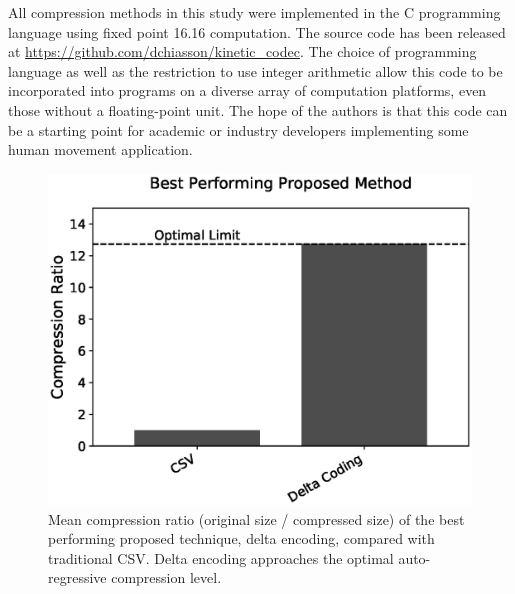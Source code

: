 \documentclass[journal]{IEEEtran}
\begin{document}
All compression methods in this study were implemented in the C programming language using fixed point 16.16 computation. The source code has been released at \url{https://github.com/dchiasson/kinetic_codec}. The choice of programming language as well as the restriction to use integer arithmetic allow this code to be incorporated into programs on a diverse array of computation platforms, even those without a floating-point unit. The hope of the authors is that this code can be a starting point for academic or industry developers implementing some human movement application.

\begin{figure}

  \includegraphics[width=\linewidth]{diff.eps}
  \caption{Mean compression ratio (original size / compressed size) of the best performing proposed technique, delta encoding, compared with traditional CSV. Delta encoding approaches the optimal auto-regressive compression level.}
  \label{fig:main_results}
  
\end{figure}
\end{document}
